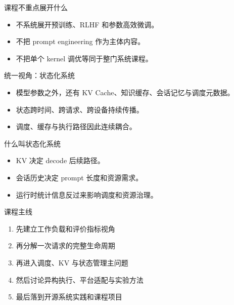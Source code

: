 \begin{frame}{课程不重点展开什么}
  \begin{itemize}
    \item 不系统展开预训练、RLHF 和参数高效微调。
    \item 不把 prompt engineering 作为主体内容。
    \item 不把单个 kernel 调优等同于整门系统课程。
  \end{itemize}
\end{frame}

\begin{frame}{统一视角：状态化系统}
  \begin{itemize}
    \item 模型参数之外，还有 KV Cache、知识缓存、会话记忆与调度元数据。
    \item 状态跨时间、跨请求、跨设备持续传播。
    \item 调度、缓存与执行路径因此连续耦合。
  \end{itemize}
\end{frame}

\begin{frame}{什么叫状态化系统}
  \begin{itemize}
    \item KV 决定 decode 后续路径。
    \item 会话历史决定 prompt 长度和资源需求。
    \item 运行时统计信息反过来影响调度和资源治理。
  \end{itemize}
\end{frame}

\begin{frame}{课程主线}
  \begin{enumerate}
    \item 先建立工作负载和评价指标视角
    \item 再分解一次请求的完整生命周期
    \item 再进入调度、KV 与状态管理主问题
    \item 然后讨论异构执行、平台适配与实验方法
    \item 最后落到开源系统实践和课程项目
  \end{enumerate}
\end{frame}

